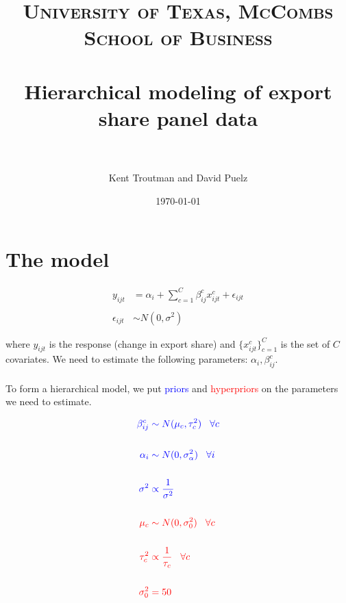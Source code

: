 \documentclass[paper=a4, fontsize=11pt]{scrartcl} %
\title{	
\normalfont \normalsize 
\textsc{University of Texas, McCombs School of Business} \\ [25pt] %
\horrule{0.1pt} \\[.5cm] %
\Large Hierarchical modeling of export share panel data \\ %
\horrule{.1pt} \\[0cm] %
}
\subtitle{}
\author{\large Kent Troutman and David Puelz} %
\date{\normalsize\today} %
\numberwithin{equation}{section} %
\numberwithin{figure}{section} %
\numberwithin{table}{section} %
\begin{document}
\maketitle
\tableofcontents
\newpage



\section{The model}

 
\begin{align}
	y_{ijt} &= \alpha_{i} + \sum_{c=1}^{C}\beta_{ij}^{c}x_{ijt}^{c} + \epsilon_{ijt}
	\\ \nonumber
	\\
	\epsilon_{ijt} &\sim N(0,\sigma^{2})
\end{align}

where $y_{ijt}$ is the response (change in export share) and $\{ x_{ijt}^{c} \}_{c=1}^{C}$ is the set of $C$ covariates.  We need to estimate the following parameters: $\alpha_{i},\beta_{ij}^{c}$.
\\
\\
To form a hierarchical model, we put \textcolor{blue}{priors} and \textcolor{red}{hyperpriors} on the parameters we need to estimate.

\begin{align}
	\color{blue} \beta_{ij}^{c} & \color{blue} \sim N(\mu_{c},\tau_{c}^{2}) \hspace{3mm} \forall c
	\\ \nonumber
	\\
	\color{blue} \alpha_{i} & \color{blue} \sim N(0,\sigma_{\alpha}^{2}) \hspace{3mm} \forall i
	\\ \nonumber
	\\
	\color{blue} \sigma^{2} & \color{blue} \propto \frac{1}{\sigma^{2}}
	\\ \nonumber
	\\
	\color{red} \mu_{c} & \color{red} \sim N(0,\sigma_{0}^{2}) \hspace{3mm} \forall c
	\\ \nonumber
	\\
	\color{red} \tau_{c}^{2} & \color{red} \propto \frac{1}{\tau_{c}} \hspace{3mm} \forall c
	\\ \nonumber
	\\
	\color{red} \sigma_{0}^{2} & \color{red} =  50
\end{align}
\end{document}
